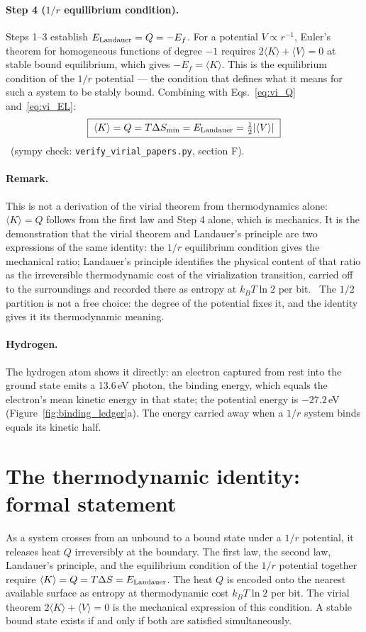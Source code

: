 \paragraph{Step 4 ($1/r$ equilibrium condition).} Steps 1--3 establish $E_{\rm Landauer}=Q=-E_f$. For a potential $V\propto r^{-1}$, Euler's theorem for
homogeneous functions of degree $-1$ requires $2\langle K\rangle+\langle V\rangle=0$ at stable bound equilibrium, which gives $-E_f=\langle K\rangle$. This is the
equilibrium condition of the $1/r$ potential --- the condition that defines what it means for such a system to be stably bound. Combining with
Eqs.~\eqref{eq:vi_Q} and~\eqref{eq:vi_EL}:
\begin{equation}
\boxed{\;\langle K\rangle=Q=T\Delta S_{\min}=E_{\rm Landauer}=\tfrac12|\langle V\rangle|\;}\label{eq:vi_identity}
\end{equation}
\derived\ (sympy check: \texttt{verify\_virial\_papers.py}, section F).

\paragraph{Remark.} This is not a derivation of the virial theorem from thermodynamics alone: $\langle K\rangle=Q$ follows from the first law and Step 4
alone, which is mechanics. It is the demonstration that the virial theorem and Landauer's principle are two expressions of the same identity: the $1/r$
equilibrium condition gives the mechanical ratio; Landauer's principle identifies the physical content of that ratio as the irreversible thermodynamic cost
of the virialization transition, carried off to the surroundings and recorded there as entropy at $k_BT\ln2$ per bit. \interp\ The $1/2$ partition is not a
free choice: the degree of the potential fixes it, and the identity gives it its thermodynamic meaning.

\paragraph{Hydrogen.} The hydrogen atom shows it directly: an electron captured from rest into the ground state emits a 13.6\,eV photon, the binding
energy, which equals the electron's mean kinetic energy in that state; the potential energy is $-27.2$\,eV (Figure~\ref{fig:binding_ledger}a). The energy
carried away when a $1/r$ system binds equals its kinetic half. \calc

\section{The thermodynamic identity: formal statement}\label{sec:vi_statement}
As a system crosses from an unbound to a bound state under a $1/r$ potential, it releases heat $Q$ irreversibly at the boundary. The first law, the second
law, Landauer's principle, and the equilibrium condition of the $1/r$ potential together require $\langle K\rangle=Q=T\Delta S=E_{\rm Landauer}$. The heat
$Q$ is encoded onto the nearest available surface as entropy at thermodynamic cost $k_BT\ln2$ per bit. The virial theorem $2\langle K\rangle+\langle
V\rangle=0$ is the mechanical expression of this condition. A stable bound state exists if and only if both are satisfied simultaneously. \interp

